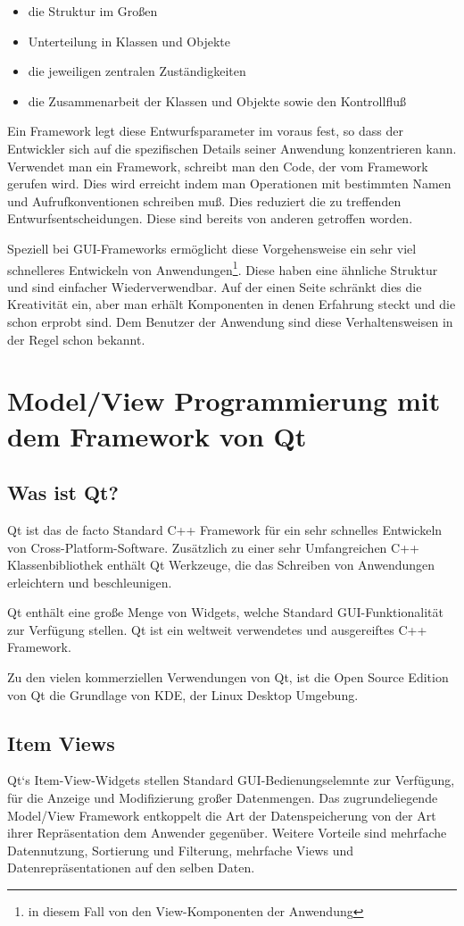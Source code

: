 \documentclass[11pt,a4paper,titlepage]{scrreprt}
\begin{document}
\begin{itemize}
\item die Struktur im Großen
\item Unterteilung in Klassen und Objekte
\item die jeweiligen zentralen Zuständigkeiten
\item die Zusammenarbeit der Klassen und Objekte sowie den Kontrollfluß
\end{itemize}

Ein Framework legt diese Entwurfsparameter im voraus fest, so dass der Entwickler
sich auf die spezifischen Details seiner Anwendung konzentrieren kann.
Verwendet man ein Framework, schreibt man den Code, der vom Framework gerufen wird.
Dies wird erreicht indem man Operationen mit bestimmten Namen und Aufrufkonventionen
schreiben muß. Dies reduziert die zu treffenden Entwurfsentscheidungen. Diese sind
bereits von anderen getroffen worden.

Speziell bei GUI-Frameworks ermöglicht diese Vorgehensweise ein sehr viel schnelleres
Entwickeln von Anwendungen\footnote{in diesem Fall von den View-Komponenten
der Anwendung}. Diese haben eine ähnliche Struktur und sind einfacher Wiederverwendbar.
Auf der einen Seite schränkt dies die Kreativität ein, aber man erhält Komponenten 
in denen Erfahrung steckt und die schon erprobt sind. Dem Benutzer der Anwendung sind
diese Verhaltensweisen in der Regel schon bekannt.

\chapter{Model/View Programmierung mit dem Framework von Qt}
\section{Was ist Qt?}
Qt ist das de facto Standard C++ Framework für ein sehr schnelles Entwickeln von
Cross-Platform-Software. Zusätzlich zu einer sehr Umfangreichen C++ Klassenbibliothek
enthält Qt Werkzeuge, die das Schreiben von Anwendungen erleichtern und
beschleunigen.

Qt enthält eine große Menge von Widgets, welche Standard GUI-Funktionalität zur
Verfügung stellen. Qt ist ein weltweit verwendetes und ausgereiftes C++ Framework.

Zu den vielen kommerziellen Verwendungen von Qt, ist die Open Source Edition
von Qt die Grundlage von KDE, der Linux Desktop Umgebung.

\section{Item Views}
Qt`s Item-View-Widgets stellen Standard GUI-Bedienungselemnte zur Verfügung, für die
Anzeige und Modifizierung großer Datenmengen. Das zugrundeliegende Model/View Framework
entkoppelt die Art der Datenspeicherung von der Art ihrer Repräsentation dem Anwender
gegenüber. Weitere Vorteile sind mehrfache Datennutzung, Sortierung und Filterung,
mehrfache Views und Datenrepräsentationen auf den selben Daten.
\end{document}
